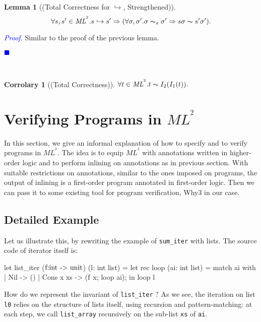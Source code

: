 \documentclass[a4paper,11pt,oneside]{article}
\theoremstyle{plain}
\newtheorem{lemma}[definition]{Lemma}
\newtheorem{corr}[definition]{Corrolary}
\renewenvironment{proof}{\noindent \begin{adjustwidth}{1.5em}{} \textcolor{blue}{\textit{Proof.}}}
{{\begin{tiny}\textcolor{blue}{$\blacksquare$}\end{tiny}}
\end{adjustwidth}~\\\noindent}
\newcommand{\inlsrc}{\textit{ML}^{^2}}
\newcommand{\icarr}{\hookrightarrow}
\newcommand{\ic}[2]{#1 \icarr #2}
\begin{document}
	\begin{lemma}[(Total Correctness for $\icarr$, Strengthened)]
     $$ \forall s,s' \in \inlsrc. \ic{s}{s'} \Rightarrow (\forall \sigma, \sigma'. \sigma \thicksim_s \sigma' \Rightarrow s\sigma \thicksim s'\sigma').$$
  \end{lemma}
	\begin{proof}
	 Similar to the proof of the previous lemma.
	\end{proof}	  
	
  \begin{corr}[(Total Correctness)]
   $ \forall t \in \inlsrc. t \thicksim I_2(I_1(t)).$
  \end{corr}	

	

\newpage
\section{Verifying Programs in \texorpdfstring{$ML^{^{2}}$}{}}

In this section, we give an informal explanation of how to specify and
to verify programs in $\inlsrc$. The idea is to equip $\inlsrc$ with
annotations written in higher-order logic and to perform inlining on
annotations as in previous section.
With suitable restrictions on annotations, similar to the ones imposed
on programs, the output of inlining is a first-order program annotated
in first-order logic. Then we can pass it to some existing tool for
program verification, Why3 in our case.

\subsection*{Detailed Example}

Let us illustrate this, by rewriting the example of \texttt{sum\_iter} with lists.
The source code of iterator itself is:
\begin{small}	
\begin{whycode}  
let list_iter ($\textcolor{black}{\text{f:int -> unit}}$) (l: int list)
 = let rec loop (ai: int list)   
    = match ai with 
       | Nil       -> ()
       | Cons x xs -> ($\textcolor{black}{\text{f}}$ x; loop ai); 
   in loop l  
 	\end{whycode}
 \end{small}	 
How do we represent the invariant of \texttt{list\_iter} ? As we see, the iteration on list \texttt{l0} relies on the structure of lists itself, using recursion and pattern-matching: at each step, we call \texttt{list\_array} recursively on the sub-list \texttt{xs} of \texttt{ai}.
\end{document}
